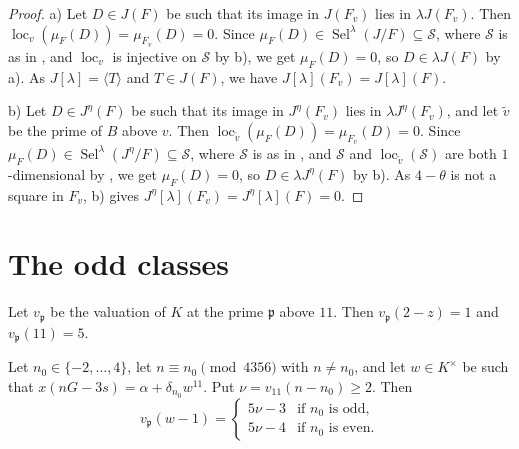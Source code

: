 \documentclass[11pt,reqno]{amsart}
\DeclareMathOperator{\Sel}{Sel}
\DeclareMathOperator{\loc}{loc}
\newcommand{\fp}{\mathfrak{p}}
\theoremstyle{definition}
\numberwithin{equation}{section}
\begin{document}
\begin{proof}
a) Let $D\in J(F)$ be such that its image in $J(F_v)$ lies in $\lambda J(F_v)$. Then $\loc_v(\mu_F(D))=\mu_{F_v}(D)=0$. Since $\mu_F(D)\in\Sel^\lambda(J/F)\subseteq\mathcal S$, where $\mathcal S$ is as in , and $\loc_v$ is injective on $\mathcal S$ by  b), we get $\mu_F(D)=0$, so $D\in\lambda J(F)$ by  a). As $J[\lambda]=\langle T\rangle$ and $T\in J(F)$, we have $J[\lambda](F_v)=J[\lambda](F)$.

b) Let $D\in J^\eta(F)$ be such that its image in $J^\eta(F_v)$ lies in $\lambda J^\eta(F_v)$, and let $\tilde v$ be the prime of $B$ above $v$. Then $\loc_{\tilde v}(\mu_F(D))=\mu_{F_v}(D)=0$. Since $\mu_F(D)\in\Sel^\lambda(J^\eta/F)\subseteq\mathcal S$, where $\mathcal S$ is as in , and $\mathcal S$ and $\loc_{\tilde v}(\mathcal S)$ are both $1$-dimensional by , we get $\mu_F(D)=0$, so $D\in\lambda J^\eta(F)$ by  b). As $4-\theta$ is not a square in $F_v$,  b) gives $J^\eta[\lambda](F_v)=J^\eta[\lambda](F)=0$.
\end{proof}

\section{The odd classes}\label{sec:odd}

Let $v_\fp$ be the valuation of $K$ at the prime $\fp$ above $11$. Then $v_\fp(2-z)=1$ and $v_\fp(11)=5$.

\begin{lemma}\label{lem:depth}
Let $n_0\in\{-2,\ldots,4\}$, let $n\equiv n_0\pmod{4356}$ with $n\neq n_0$, and let $w\in K^\times$ be such that $x(nG-3s)=\alpha+\delta_{n_0}w^{11}$. Put $\nu=v_{11}(n-n_0)\geq 2$. Then
$$v_\fp(w-1)=\begin{cases}5\nu-3 & \text{if } n_0 \text{ is odd},\\ 5\nu-4 & \text{if } n_0 \text{ is even}.\end{cases}$$
\end{lemma}
\end{document}
